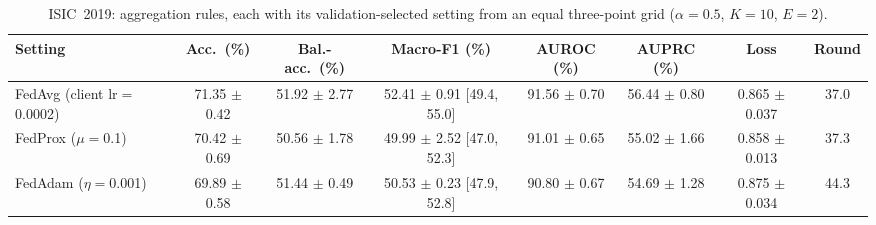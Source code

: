 \begin{table}[!t]
\caption{ISIC~2019: aggregation rules, each with its validation-selected setting from an equal three-point grid ($\alpha{=}0.5$, $K{=}10$, $E{=}2$).}
\label{tab:19-strategy}
\centering
\footnotesize
\begin{tabular}{lccccccc}
\toprule
Setting & Acc.\ (\%) & Bal.-acc.\ (\%) & Macro-F1 (\%) & AUROC (\%) & AUPRC (\%) & Loss & Round \\
\midrule
FedAvg (client lr$=$0.0002) & 71.35 $\pm$ 0.42 & 51.92 $\pm$ 2.77 & 52.41 $\pm$ 0.91 [49.4, 55.0] & 91.56 $\pm$ 0.70 & 56.44 $\pm$ 0.80 & 0.865 $\pm$ 0.037 & 37.0 \\
FedProx ($\mu$$=$0.1) & 70.42 $\pm$ 0.69 & 50.56 $\pm$ 1.78 & 49.99 $\pm$ 2.52 [47.0, 52.3] & 91.01 $\pm$ 0.65 & 55.02 $\pm$ 1.66 & 0.858 $\pm$ 0.013 & 37.3 \\
FedAdam ($\eta$$=$0.001) & 69.89 $\pm$ 0.58 & 51.44 $\pm$ 0.49 & 50.53 $\pm$ 0.23 [47.9, 52.8] & 90.80 $\pm$ 0.67 & 54.69 $\pm$ 1.28 & 0.875 $\pm$ 0.034 & 44.3 \\
\bottomrule
\end{tabular}
\end{table}